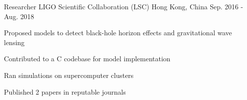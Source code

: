 \begin{cventries}
  \cventry
    {Researcher} %
    {LIGO Scientific Collaboration (LSC)} %
    {Hong Kong, China} %
    {Sep. 2016 - Aug. 2018} %
    {
      \begin{cvitems} %
        \item{Proposed models to detect black-hole horizon effects and gravitational wave lensing}
        \item{Contributed to a C codebase for model implementation}
        \item{Ran simulations on supercomputer clusters}
        \item{Published 2 papers in reputable journals}
      \end{cvitems}
    }


\end{cventries}
